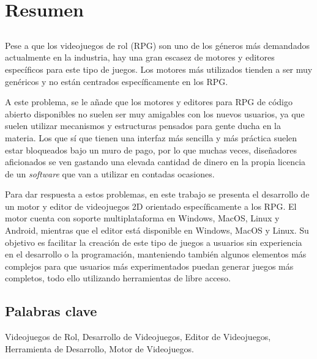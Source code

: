 \chapter*{Resumen}

\section*{\tituloPortadaVal}

Pese a que los videojuegos de rol (RPG) son uno de los géneros más demandados actualmente en la industria, hay una gran escasez de motores y editores específicos para este tipo de juegos. Los motores más utilizados tienden a ser muy genéricos y no están centrados específicamente en los RPG.

\smallskip

A este problema, se le añade que los motores y editores para RPG de código abierto disponibles no suelen ser muy amigables con los nuevos usuarios, ya que suelen utilizar mecanismos y estructuras pensados para gente ducha en la materia. Los que sí que tienen una interfaz más sencilla y más práctica suelen estar bloqueados bajo un muro de pago, por lo que muchas veces, diseñadores aficionados se ven gastando una elevada cantidad de dinero en la propia licencia de un \textit{software} que van a utilizar en contadas ocasiones.

\medskip

Para dar respuesta a estos problemas, en este trabajo se presenta el desarrollo de un motor y editor de videojuegos 2D orientado específicamente a los RPG. El motor cuenta con soporte multiplataforma en Windows, MacOS, Linux y Android, mientras que el editor está disponible en Windows, MacOS y Linux. Su objetivo es facilitar la creación de este tipo de juegos a usuarios sin experiencia en el desarrollo o la programación, manteniendo también algunos elementos más complejos para que usuarios más experimentados puedan generar juegos más completos, todo ello utilizando herramientas de libre acceso.

\section*{Palabras clave}
   
\noindent Videojuegos de Rol, Desarrollo de Videojuegos, Editor de Videojuegos, Herramienta de Desarrollo, Motor de Videojuegos.

   


